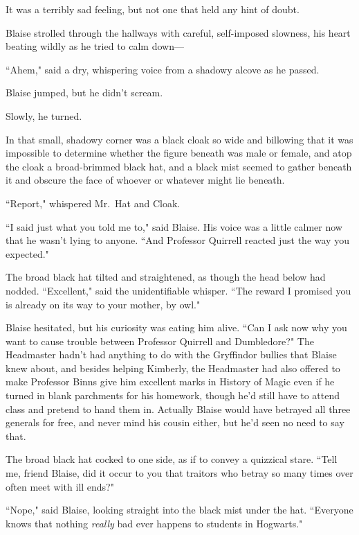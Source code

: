 It was a terribly sad feeling, but not one that held any hint of doubt.


Blaise strolled through the hallways with careful, self-imposed slowness, his heart beating wildly as he tried to calm down—

``Ahem," said a dry, whispering voice from a shadowy alcove as he passed.

Blaise jumped, but he didn't scream.

Slowly, he turned.

In that small, shadowy corner was a black cloak so wide and billowing that it was impossible to determine whether the figure beneath was male or female, and atop the cloak a broad-brimmed black hat, and a black mist seemed to gather beneath it and obscure the face of whoever or whatever might lie beneath.

``Report," whispered Mr.~Hat and Cloak.

``I said just what you told me to," said Blaise. His voice was a little calmer now that he wasn't lying to anyone. ``And Professor Quirrell reacted just the way you expected."

The broad black hat tilted and straightened, as though the head below had nodded. ``Excellent," said the unidentifiable whisper. ``The reward I promised you is already on its way to your mother, by owl."

Blaise hesitated, but his curiosity was eating him alive. ``Can I ask now why you want to cause trouble between Professor Quirrell and Dumbledore?" The Headmaster hadn't had anything to do with the Gryffindor bullies that Blaise knew about, and besides helping Kimberly, the Headmaster had also offered to make Professor Binns give him excellent marks in History of Magic even if he turned in blank parchments for his homework, though he'd still have to attend class and pretend to hand them in. Actually Blaise would have betrayed all three generals for free, and never mind his cousin either, but he'd seen no need to say that.

The broad black hat cocked to one side, as if to convey a quizzical stare. ``Tell me, friend Blaise, did it occur to you that traitors who betray so many times over often meet with ill ends?"

``Nope," said Blaise, looking straight into the black mist under the hat. ``Everyone knows that nothing \emph{really} bad ever happens to students in Hogwarts."

